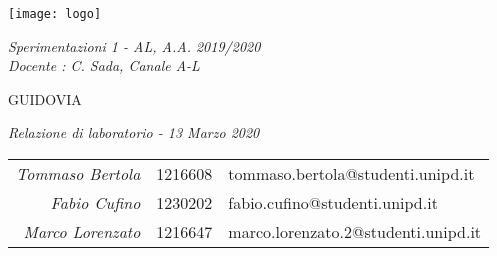 
\thispagestyle{empty}
\begin{minipage}{0.51 \textwidth}
	\vspace{-1 cm}	\begin{flushleft}
		\hspace{-2cm}	\texttt{[image: logo]}
	\end{flushleft}
\end{minipage}
\begin{minipage}{0.51\textwidth}
	\vspace{-1 cm}	\begin{flushright}
		\emph{Sperimentazioni 1 - AL, A.A. 2019/2020} \\
		\emph{Docente : C. Sada, Canale A-L}
	\end{flushright}
\end{minipage}
\null

\bigskip\bigskip\bigskip\bigskip\bigskip\bigskip\bigskip\bigskip\bigskip\bigskip\bigskip\bigskip\bigskip\bigskip\bigskip


\begin{center}
    {\Huge{GUIDOVIA}}
\end{center}

\begin{center}
    {\Large\emph{Relazione di laboratorio - 13 Marzo 2020}}\par
\end{center}
\par

\bigskip\bigskip\bigskip\bigskip\bigskip\bigskip\bigskip\bigskip\bigskip\bigskip\bigskip\bigskip\bigskip\bigskip\bigskip\bigskip\bigskip\bigskip\bigskip

\begin{table}[h!]
		\centering
		\begin{tabular}{rll}
			\Large\color{Pantone1807}\itshape{Tommaso Bertola}	& {1216608} &  {tommaso.bertola@studenti.unipd.it}\\[0.125 cm]
			\Large\color{Pantone1807}\itshape{Fabio Cufino}	& {1230202} &  {fabio.cufino@studenti.unipd.it}\\[0.125 cm]
			\Large\color{Pantone1807}\itshape{Marco Lorenzato}	& {1216647} &  {marco.lorenzato.2@studenti.unipd.it}\\[0.125 cm]
		\end{tabular}
	\end{table}
